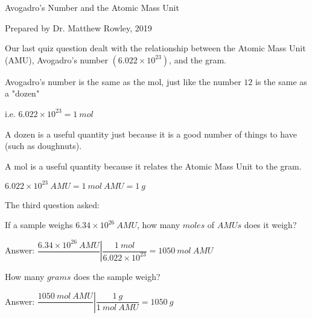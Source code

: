 \documentclass[12pt, openany, letterpaper]{memoir}
\begin{document}
\begin{center}
{\Large Avogadro's Number and the Atomic Mass Unit}

Prepared by Dr. Matthew Rowley, 2019
\end{center}

Our last quiz question dealt with the relationship between the Atomic Mass Unit (AMU), Avogadro's number $\left(6.022\times10^{23}\right)$, and the gram.

Avogadro's number is the same as the mol, just like the number $12$ is the same as a "dozen"

i.e. $6.022\times10^{23}=1~mol$

A dozen is a useful quantity just because it is a good number of things to have (such as doughnuts).

A mol is a useful quantity because it relates the Atomic Mass Unit to the gram. 

$6.022\times10^{23}~AMU=1~mol~AMU=1~g$

The third question asked:

\vspace{1em}
If a sample weighs $6.34\times10^{26}~AMU$, how many $moles$ of $AMUs$ does it weigh?

\color{blue}
Answer: $\dfrac{6.34\times10^{26}~AMU}{}\left|\dfrac{1~mol}{6.022\times10^{23}}\right.= 1050~mol~AMU$

\color{black}
\vspace{1em}
How many $grams$ does the sample weigh?

\color{blue}
Answer: $\dfrac{1050~mol~AMU}{}\left|\dfrac{1~g}{1~mol~AMU}\right.= 1050~g$
\end{document}
